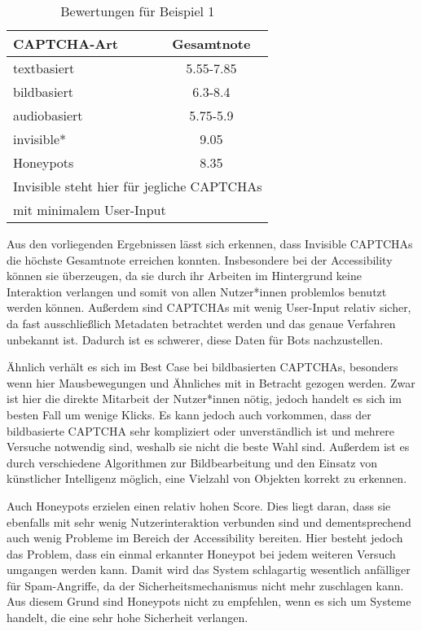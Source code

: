 \begin{table}[h!]
    \caption{Bewertungen für Beispiel 1}
    \begin{center}
        \begin{tabular}{l|c}
            CAPTCHA-Art                       & Gesamtnote \\\hline
            textbasiert            &  5.55-7.85       \\
            bildbasiert                   &  6.3-8.4      \\
            audiobasiert        & 5.75-5.9         \\
            invisible*                      & 9.05         \\
            Honeypots       & 8.35\\
            \multicolumn{2}{l}{\footnotesize * Invisible steht hier für jegliche CAPTCHAs} \\
            \multicolumn{2}{l}{\footnotesize \space \space mit minimalem User-Input}
        \end{tabular}
    \end{center}
\end{table}

Aus den vorliegenden Ergebnissen lässt sich erkennen, dass Invisible CAPTCHAs die höchste Gesamtnote erreichen konnten.
Insbesondere bei der Accessibility können sie überzeugen, 
da sie durch ihr Arbeiten im Hintergrund keine Interaktion verlangen und somit von allen Nutzer*innen problemlos benutzt werden können.
Außerdem sind CAPTCHAs mit wenig User-Input relativ sicher, da fast ausschließlich Metadaten betrachtet werden und das genaue Verfahren unbekannt ist.
Dadurch ist es schwerer, diese Daten für Bots nachzustellen.

Ähnlich verhält es sich im Best Case bei bildbasierten CAPTCHAs, besonders wenn hier Mausbewegungen und Ähnliches mit in Betracht gezogen werden.
Zwar ist hier die direkte Mitarbeit der Nutzer*innen nötig, jedoch handelt es sich im besten Fall um wenige Klicks. 
Es kann jedoch auch vorkommen, dass der bildbasierte CAPTCHA sehr kompliziert oder unverständlich ist und mehrere Versuche notwendig sind,
weshalb sie nicht die beste Wahl sind.
Außerdem ist es durch verschiedene Algorithmen zur Bildbearbeitung und den Einsatz von künstlicher Intelligenz möglich,
eine Vielzahl von Objekten korrekt zu erkennen.

Auch Honeypots erzielen einen relativ hohen Score.
Dies liegt daran, dass sie ebenfalls mit sehr wenig Nutzerinteraktion verbunden sind
und dementsprechend auch wenig Probleme im Bereich der Accessibility bereiten.
Hier besteht jedoch das Problem, dass ein einmal erkannter Honeypot bei jedem weiteren Versuch umgangen werden kann.
Damit wird das System schlagartig wesentlich anfälliger für Spam-Angriffe, da der Sicherheitsmechanismus nicht mehr zuschlagen kann.
Aus diesem Grund sind Honeypots nicht zu empfehlen, wenn es sich um Systeme handelt, die eine sehr hohe Sicherheit verlangen.

